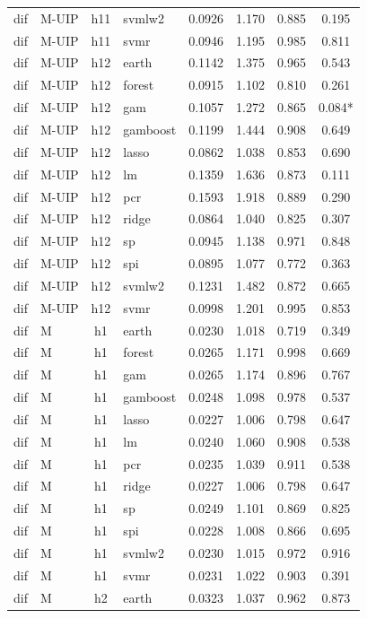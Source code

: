 \begin{ThreePartTable}
\begin{longtable}[t]{llclcccc}
dif & M-UIP & h11 & svmlw2 & 0.0926 & 1.170 & 0.885 & 0.195\\
dif & M-UIP & h11 & svmr & 0.0946 & 1.195 & 0.985 & 0.811\\
\addlinespace
dif & M-UIP & h12 & earth & 0.1142 & 1.375 & 0.965 & 0.543\\
dif & M-UIP & h12 & forest & 0.0915 & 1.102 & 0.810 & 0.261\\
dif & M-UIP & h12 & gam & 0.1057 & 1.272 & 0.865 & 0.084*\\
dif & M-UIP & h12 & gamboost & 0.1199 & 1.444 & 0.908 & 0.649\\
dif & M-UIP & h12 & lasso & 0.0862 & 1.038 & 0.853 & 0.690\\
dif & M-UIP & h12 & lm & 0.1359 & 1.636 & 0.873 & 0.111\\
dif & M-UIP & h12 & pcr & 0.1593 & 1.918 & 0.889 & 0.290\\
dif & M-UIP & h12 & ridge & 0.0864 & 1.040 & 0.825 & 0.307\\
dif & M-UIP & h12 & sp & 0.0945 & 1.138 & 0.971 & 0.848\\
dif & M-UIP & h12 & spi & 0.0895 & 1.077 & 0.772 & 0.363\\
dif & M-UIP & h12 & svmlw2 & 0.1231 & 1.482 & 0.872 & 0.665\\
dif & M-UIP & h12 & svmr & 0.0998 & 1.201 & 0.995 & 0.853\\
\addlinespace
dif & M & h1 & earth & 0.0230 & 1.018 & 0.719 & 0.349\\
dif & M & h1 & forest & 0.0265 & 1.171 & 0.998 & 0.669\\
dif & M & h1 & gam & 0.0265 & 1.174 & 0.896 & 0.767\\
dif & M & h1 & gamboost & 0.0248 & 1.098 & 0.978 & 0.537\\
dif & M & h1 & lasso & 0.0227 & 1.006 & 0.798 & 0.647\\
dif & M & h1 & lm & 0.0240 & 1.060 & 0.908 & 0.538\\
dif & M & h1 & pcr & 0.0235 & 1.039 & 0.911 & 0.538\\
dif & M & h1 & ridge & 0.0227 & 1.006 & 0.798 & 0.647\\
dif & M & h1 & sp & 0.0249 & 1.101 & 0.869 & 0.825\\
dif & M & h1 & spi & 0.0228 & 1.008 & 0.866 & 0.695\\
dif & M & h1 & svmlw2 & 0.0230 & 1.015 & 0.972 & 0.916\\
dif & M & h1 & svmr & 0.0231 & 1.022 & 0.903 & 0.391\\
\addlinespace
dif & M & h2 & earth & 0.0323 & 1.037 & 0.962 & 0.873\\

\end{longtable}
\end{ThreePartTable}
